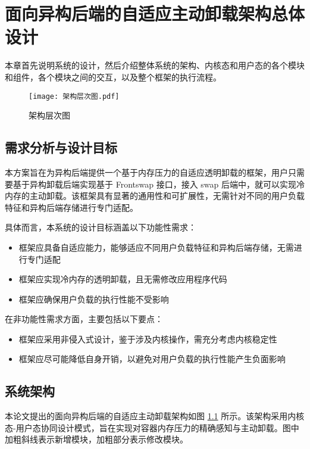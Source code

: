 \chapter{面向异构后端的自适应主动卸载架构总体设计}

本章首先说明系统的设计，然后介绍整体系统的架构、内核态和用户态的各个模块和组件，各个模块之间的交互，以及整个框架的执行流程。

\begin{figure}[h]
    \centering
    \texttt{[image: 架构层次图.pdf]}
    \caption{架构层次图}
    \label{fig:system_architecture_hierarchy}
\end{figure}

\section{需求分析与设计目标}

本方案旨在为异构后端提供一个基于内存压力的自适应透明卸载的框架，用户只需要基于异构卸载后端实现基于 Frontswap 接口，接入 swap 后端中，就可以实现冷内存的主动卸载。该框架具有显著的通用性和可扩展性，无需针对不同的用户负载特征和异构后端存储进行专门适配。


具体而言，本系统的设计目标涵盖以下功能性需求：
\begin{itemize}
\item 框架应具备自适应能力，能够适应不同用户负载特征和异构后端存储，无需进行专门适配
\item 框架应实现冷内存的透明卸载，且无需修改应用程序代码
\item 框架应确保用户负载的执行性能不受影响
\end{itemize}

在非功能性需求方面，主要包括以下要点：
\begin{itemize}
\item 框架应采用非侵入式设计，鉴于涉及内核操作，需充分考虑内核稳定性
\item 框架应尽可能降低自身开销，以避免对用户负载的执行性能产生负面影响
\end{itemize}

\section{系统架构}
本论文提出的面向异构后端的自适应主动卸载架构如图 \ref{fig:system_architecture_hierarchy} 所示。该架构采用内核态-用户态协同设计模式，旨在实现对容器内存压力的精确感知与主动卸载。图中加粗斜线表示新增模块，加粗部分表示修改模块。


